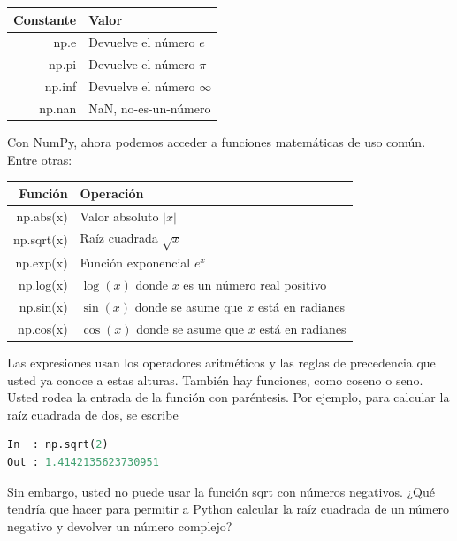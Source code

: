 \vs

\begin{tabular}{r|l}
Constante 			& Valor\\
\hline
np.e 				& Devuelve el número $e$ \\
np.pi 			& Devuelve el número $\pi$ \\
np.inf 			& Devuelve el número $\infty$ \\
np.nan 			& NaN, no-es-un-número \\
\hline
\end{tabular}

\vs



Con NumPy, ahora podemos acceder a funciones matemáticas de uso común. Entre otras: \vs

\begin{tabular}{r|l}
Función 			& Operación \\
\hline
np.abs(x)   		& Valor absoluto $|x|$ \\
np.sqrt(x)			&  Raíz cuadrada $\sqrt{x}$ \\
np.exp(x) 			& Función exponencial $e^x$ \\
np.log(x) 			& $\log(x)$ donde $x$ es un número real positivo\\
np.sin(x)			&  $\sin(x)$ donde se asume que $x$ está en radianes \\
np.cos(x) 			& $\cos(x)$ donde se asume que $x$ está en radianes \\
\hline
\end{tabular}

\vs
Las expresiones usan los operadores aritméticos y las reglas de precedencia que usted ya conoce a estas alturas.
También hay funciones, como coseno o seno. Usted rodea la
entrada de la función con paréntesis. Por ejemplo, para calcular la
raíz cuadrada de dos, se escribe

\begin{lstlisting}[language=Python]
In 	: np.sqrt(2)
Out	: 1.4142135623730951
\end{lstlisting}

Sin embargo, usted no puede usar la función {\s sqrt} con números negativos. ¿Qué tendría que hacer para permitir a Python calcular la raíz cuadrada de un número negativo y devolver un número complejo? \QA  %

